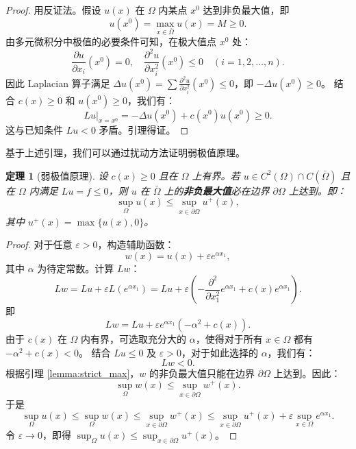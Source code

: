 \documentclass[12pt,a4paper]{ctexart}
\newtheorem{theorem}{定理}[section]
\begin{document}
	\begin{proof}
		用反证法。假设 $u(x)$ 在 $\Omega$ 内某点 $x^0$ 达到非负最大值，即
		\[
		u(x^0) = \max_{x \in \bar{\Omega}} u(x) = M \ge 0.
		\]
		由多元微积分中极值的必要条件可知，在极大值点 $x^0$ 处：
		\[
		\frac{\partial u}{\partial x_i}(x^0) = 0, \quad \frac{\partial^2 u}{\partial x_i^2}(x^0) \le 0 \quad (i=1, 2, \dots, n).
		\]
		因此 Laplacian 算子满足 $\Delta u(x^0) = \sum \frac{\partial^2 u}{\partial x_i^2}(x^0) \le 0$，即 $-\Delta u(x^0) \ge 0$。
		结合 $c(x) \ge 0$ 和 $u(x^0) \ge 0$，我们有：
		\[
		Lu \big|_{x=x^0} = -\Delta u(x^0) + c(x^0)u(x^0) \ge 0.
		\]
		这与已知条件 $Lu < 0$ 矛盾。引理得证。
	\end{proof}
	
	基于上述引理，我们可以通过扰动方法证明弱极值原理。
	
	\begin{theorem}[弱极值原理] \label{thm:weak_max}
		设 $c(x) \ge 0$ 且在 $\Omega$ 上有界。若 $u \in C^2(\Omega) \cap C(\bar{\Omega})$ 且在 $\Omega$ 内满足 $Lu = f \le 0$，则 $u$ 在 $\bar{\Omega}$ 上的\textbf{非负最大值}必在边界 $\partial \Omega$ 上达到。即：
		\begin{equation}
			\sup_{\Omega} u(x) \le \sup_{x \in \partial \Omega} u^+(x),
		\end{equation}
		其中 $u^+(x) = \max\{ u(x), 0 \}$。
	\end{theorem}
	
	\begin{proof}
		对于任意 $\varepsilon > 0$，构造辅助函数：
		\[
		w(x) = u(x) + \varepsilon e^{\alpha x_1},
		\]
		其中 $\alpha$ 为待定常数。计算 $Lw$：
		\[
		Lw = Lu + \varepsilon L(e^{\alpha x_1}) = Lu + \varepsilon \left( -\frac{\partial^2}{\partial x_1^2} e^{\alpha x_1} + c(x)e^{\alpha x_1} \right).
		\]
		即
		\[
		Lw = Lu + \varepsilon e^{\alpha x_1} (-\alpha^2 + c(x)).
		\]
		由于 $c(x)$ 在 $\Omega$ 内有界，可选取充分大的 $\alpha$，使得对于所有 $x \in \Omega$ 都有 $-\alpha^2 + c(x) < 0$。
		结合 $Lu \le 0$ 及 $\varepsilon > 0$，对于如此选择的 $\alpha$，我们有：
		\[
		Lw < 0.
		\]
		根据引理 \ref{lemma:strict_max}，$w$ 的非负最大值只能在边界 $\partial \Omega$ 上达到。因此：
		\[
		\sup_{\Omega} w(x) \le \sup_{x \in \partial \Omega} w^+(x).
		\]
		于是
		\[
		\sup_{\Omega} u(x) \le \sup_{\Omega} w(x) \le \sup_{x \in \partial \Omega} w^+(x) \le \sup_{x \in \partial \Omega} u^+(x) + \varepsilon \sup_{x \in \Omega} e^{\alpha x_1}.
		\]
		令 $\varepsilon \to 0$，即得 $\sup_{\Omega} u(x) \le \sup_{x \in \partial \Omega} u^+(x)$。
	\end{proof}
	
\end{document}
